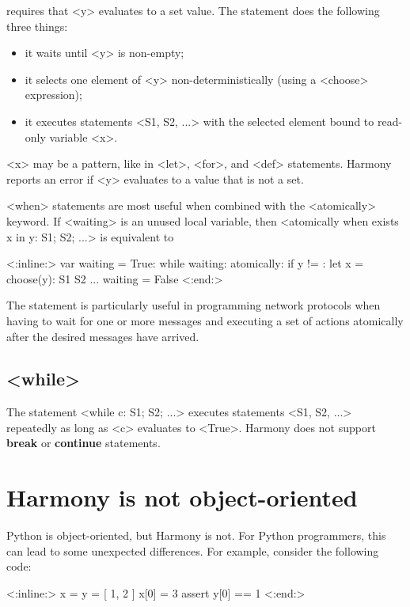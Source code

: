 \documentclass{report}
\newenvironment{code}{
\tcolorbox
}{
\endtcolorbox
}
\begin{document}
requires that <{y}> evaluates to a set value.
The statement does the following three things:
\begin{itemize}
\item it waits until <{y}> is non-empty;
\item it selects one element of <{y}> non-deterministically (using
a <{choose}> expression);
\item it executes statements <{S1, S2, ...}> with the selected element
bound to read-only variable <{x}>.
\end{itemize}
<{x}> may be a pattern, like in <{let}>, <{for}>, and <{def}>
statements.
Harmony reports an error if <{y}> evaluates to a value that is not a set.

<{when}> statements are most useful when combined with the
<{atomically}> keyword.
If <{waiting}> is an unused local variable,
then <{atomically when exists x in y: S1; S2; ...}> is equivalent to

\begin{code}
<{:inline:}>
var waiting = True:
    while waiting:
        atomically:
            if y != {}:
                let x = choose(y):
                    S1
                    S2
                    ...
                waiting = False
<{:end:}>
\end{code}

The statement is particularly useful in programming network protocols
when having to wait for one or more messages and executing a set
of actions atomically after the desired messages have arrived.

\subsection*{<{while}>}

The statement <{while c: S1; S2; ...}> executes statements
<{S1, S2, ...}> repeatedly as long as <{c}> evaluates to <{True}>.
Harmony does not support \textbf{break} or \textbf{continue} statements.

\section{Harmony is not object-oriented}

Python is object-oriented, but Harmony is not.  For Python programmers,
this can lead to some unexpected differences.
For example, consider the following code:

\begin{code}
<{:inline:}>
x = y = [ 1, 2 ]
x[0] = 3
assert y[0] == 1
<{:end:}>
\end{code}
\end{document}
